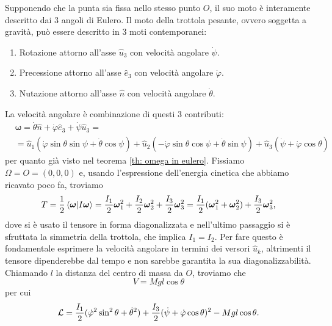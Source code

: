    Supponendo che la punta sia fissa nello stesso punto $O$, il suo moto è interamente descritto dai $3$ angoli di Eulero. Il moto della trottola pesante, ovvero soggetta a gravità, può essere descritto in 3 moti contemporanei:
   \begin{enumerate}
       \item Rotazione attorno all'asse $\hat{u}_3$ con velocità angolare $\dot{\psi}$.
       \item Precessione attorno all'asse $\hat{e}_3$ con velocità angolare $\dot{\varphi}$.
       \item Nutazione attorno all'asse $\hat{n}$ con velocità angolare $\dot{\theta}$.
   \end{enumerate}
    La velocità angolare è combinazione di questi 3 contributi:
    \begin{equation}
    \begin{aligned}
        &\boldsymbol{\omega} = \dot{\theta}\hat{n}+ \dot{\varphi}\hat{e}_3 + \dot{\psi}\hat{u}_3=\\
        &=\hat{u}_1(\dot{\varphi}\sin\theta\sin\psi +\dot{\theta}\cos\psi)+\hat{u}_2(-\dot{\varphi}\sin\theta\cos\psi+\dot{\theta}\sin\psi)+\hat{u}_3(\dot{\psi}+\dot{\varphi}\cos\theta)
    \end{aligned}
    \end{equation}
    per quanto già visto nel teorema \ref{th: omega in eulero}. Fissiamo $\Omega = O=(0,0,0)$ e, usando l'espressione dell'energia cinetica che abbiamo ricavato poco fa, troviamo
    \begin{equation}
        T = \frac{1}{2}\braket{\boldsymbol{\omega}|I\boldsymbol{\omega}} = \frac{I_1}{2}\boldsymbol{\omega}_1^2 +\frac{I_2}{2}\boldsymbol{\omega}_2^2+\frac{I_3}{2}\boldsymbol{\omega}_3^2 = \frac{I_1}{2}(\boldsymbol{\omega}_1^2+\boldsymbol{\omega}_2^2)+\frac{I_3}{2}\boldsymbol{\omega}_3^2,
    \end{equation}
    dove si è usato il tensore in forma diagonalizzata e nell'ultimo passaggio si è sfruttata la simmetria della trottola, che implica $I_1=I_2.$ Per fare questo è fondamentale esprimere la velocità angolare in termini dei versori $\hat{u}_k$, altrimenti il tensore dipenderebbe dal tempo e non sarebbe garantita la sua diagonalizzabilità. Chiamando $l$ la distanza del centro di massa da $O$, troviamo che
    \begin{equation}
        V = Mgl\cos\theta
    \end{equation}
    per cui 
    \begin{equation}
        \mathcal{L} = \frac{I_1}{2}(\dot{\varphi}^2\sin^2\theta+\dot{\theta}^2)+\frac{I_3}{2}(\dot{\psi}+\dot{\varphi}\cos\theta)^2-Mgl\cos\theta.
    \end{equation}

